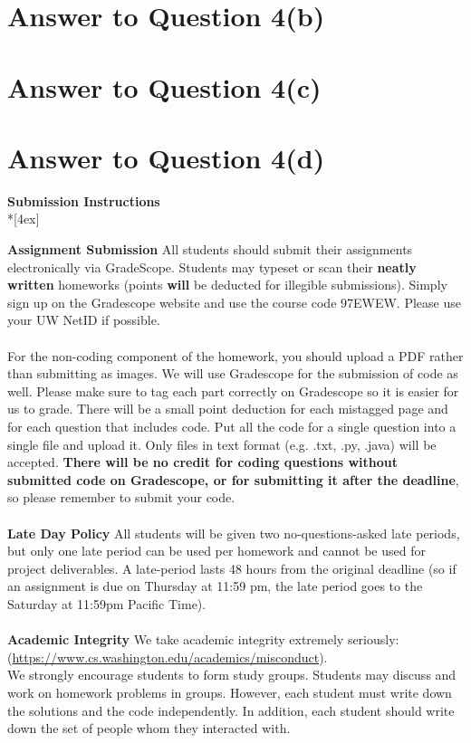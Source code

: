 \documentclass[11pt]{article}
\begin{document}
\pagebreak[4]
\section*{Answer to Question 4(b)}

\pagebreak[4]
\section*{Answer to Question 4(c)}

\pagebreak[4]
\section*{Answer to Question 4(d)}

\pagebreak[4]
\begin{center}
\LARGE{\bf \textsf{Submission Instructions}} \\*[4ex]
\end{center}

\textbf{Assignment Submission } All students should submit their assignments electronically via GradeScope. Students may typeset or scan their \textbf{neatly written} homeworks (points \textbf{will} be deducted for illegible submissions). Simply sign up on the Gradescope website and use the course code 97EWEW. Please use your UW NetID if possible.
\\
\\
For the non-coding component of the homework, you should upload a PDF rather than submitting as images. We will use Gradescope for the submission of code as well. Please make sure to tag each part correctly on Gradescope so it is easier for us to grade. There will be a small point deduction for each mistagged page and for each question that includes code. Put all the code for a single question into a single file and upload it. Only files in text format (e.g. .txt, .py, .java) will be accepted. \textbf{There will be no credit for coding questions without submitted code on Gradescope, or for submitting it after the deadline}, so please remember to submit your code.
\\
\\
\textbf{Late Day Policy } All students will be given two no-questions-asked late periods, but only one late period can be used per homework and cannot be used for project deliverables. A late-period lasts 48 hours from the original deadline (so if an assignment is due on Thursday at 11:59 pm, the late period goes to the Saturday at 11:59pm Pacific Time).
\\
\\
\textbf{Academic Integrity} We take academic integrity extremely seriously:\\ (\url{https://www.cs.washington.edu/academics/misconduct}).\\
We strongly encourage students to form study groups. Students may discuss and work on homework problems in groups. However, each student must write down the solutions and the code independently. In addition, each student should write down the set of people whom they interacted with. 
\end{document}
